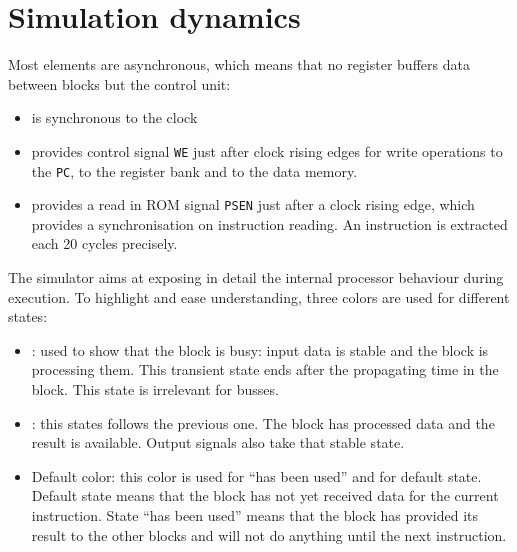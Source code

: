\documentclass[10pt,a4paper]{article}
\theoremstyle{definition}%
\begin{document}
\section{Simulation dynamics}
Most elements are asynchronous, which means that no register buffers data between blocks but the control unit:
\begin{itemize}
\item is synchronous to the clock
\item provides control signal \verb!WE! just after clock rising edges for write operations to the \verb!PC!, to the register bank and to the data memory.
\item provides a read in ROM signal \verb!PSEN! just after a clock rising edge, which provides a synchronisation on instruction reading. An instruction is extracted each 20 \textonehalf cycles precisely.
\end{itemize}

The simulator aims at exposing in detail the internal processor behaviour during execution. To highlight and ease understanding, three colors %
 are used for different states:
\begin{itemize}
\item {\color{green}{Green}}: used to show that the block is busy: input data is stable and the block is processing them. This transient state ends after the propagating time in the block. This state is irrelevant for busses.
\item {\color{orange}{Orange}}: this states follows the previous one. The block has processed data and the result is available. Output signals also take that stable state.
\item Default color: this color is used for ``has been used'' and for default state. Default state means that the block has not yet received data for the current instruction. State ``has been used'' means that the block has provided its result to the other blocks and will not do anything until the next instruction.
\end{itemize}
\end{document}
